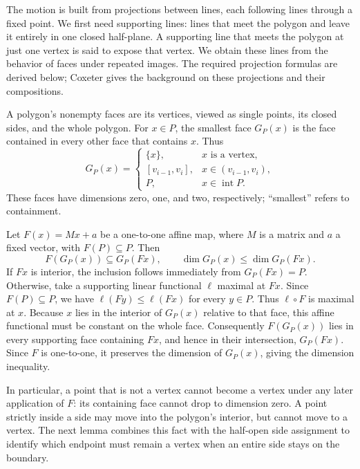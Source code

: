 \documentclass[11pt,a4paper]{article}
\theoremstyle{definition}
\theoremstyle{remark}
\numberwithin{equation}{section}
\begin{document}
The motion is built from projections between lines, each following lines through a fixed point. We first need supporting lines: lines that meet the polygon and leave it entirely in one closed half-plane. A supporting line that meets the polygon at just one vertex is said to expose that vertex. We obtain these lines from the behavior of faces under repeated images. The required projection formulas are derived below; Coxeter \cite{Coxeter} gives the background on these projections and their compositions.

A polygon's nonempty faces are its vertices, viewed as single points, its closed sides, and the whole polygon. For $x\in P$, the smallest face $G_P(x)$ is the face contained in every other face that contains $x$. Thus
\[
 G_P(x)=\begin{cases}
 \{x\},&x\text{ is a vertex},\\
 [v_{i-1},v_i],&x\in(v_{i-1},v_i),\\
 P,&x\in\operatorname{int}P.
 \end{cases}
\]
These faces have dimensions zero, one, and two, respectively; ``smallest'' refers to containment.

Let $F(x)=Mx+a$ be a one-to-one affine map, where $M$ is a matrix and $a$ a fixed vector, with $F(P)\subseteq P$. Then
\[
 F(G_P(x))\subseteq G_P(Fx),\qquad
 \dim G_P(x)\le\dim G_P(Fx).
\]
If $Fx$ is interior, the inclusion follows immediately from $G_P(Fx)=P$. Otherwise, take a supporting linear functional $\ell$ maximal at $Fx$. Since $F(P)\subseteq P$, we have $\ell(Fy)\le\ell(Fx)$ for every $y\in P$. Thus $\ell\circ F$ is maximal at $x$. Because $x$ lies in the interior of $G_P(x)$ relative to that face, this affine functional must be constant on the whole face. Consequently $F(G_P(x))$ lies in every supporting face containing $Fx$, and hence in their intersection, $G_P(Fx)$. Since $F$ is one-to-one, it preserves the dimension of $G_P(x)$, giving the dimension inequality.

In particular, a point that is not a vertex cannot become a vertex under any later application of $F$: its containing face cannot drop to dimension zero. A point strictly inside a side may move into the polygon's interior, but cannot move to a vertex. The next lemma combines this fact with the half-open side assignment to identify which endpoint must remain a vertex when an entire side stays on the boundary.
\end{document}
